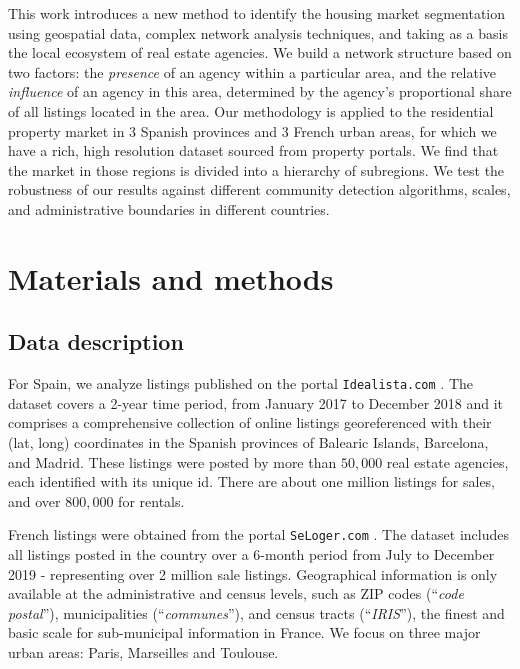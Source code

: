 This work introduces a new method to identify the housing market segmentation using geospatial data, complex network analysis techniques, and taking as a basis the local ecosystem of real estate agencies. We build a network structure based on two factors:  the \textit{presence} of an agency within a particular area, and the relative \textit{influence} of an agency in this area, determined by the agency's proportional share of all listings located in the area. Our methodology is applied to the residential property market in 3 Spanish provinces and 3 French urban areas, for which we have a rich, high resolution dataset sourced from property portals. We find that the market in those regions is divided into a hierarchy of subregions. We test the robustness of our results against different community detection algorithms, scales, and administrative boundaries in different countries.

\section{Materials and methods}
\label{sec:materials_and_methods}

\subsection{Data description}

For Spain, we analyze listings published on the portal \texttt{Idealista.com} \cite{idealista}. The dataset covers a 2-year time period, from January 2017 to December 2018 and it comprises a comprehensive collection of online listings georeferenced with their (lat, long) coordinates in the Spanish provinces of Balearic Islands, Barcelona, and Madrid. These listings were posted by more than $50,000$ real estate agencies, each identified with its unique id. There are about one million listings for sales, and over $800,000$ for rentals. 

French listings were obtained from the portal \texttt{SeLoger.com} \cite{SeLoger}. The dataset includes all listings posted in the country over a 6-month period from July to December 2019 - representing over 2 million sale listings. Geographical information is only available at the administrative and census levels, such as ZIP codes (``\textit{code postal}''), municipalities (``\textit{communes}''), and census tracts (``\textit{IRIS}''), the finest and basic scale for sub-municipal information in France. We focus on three major urban areas: Paris, Marseilles and Toulouse. 

